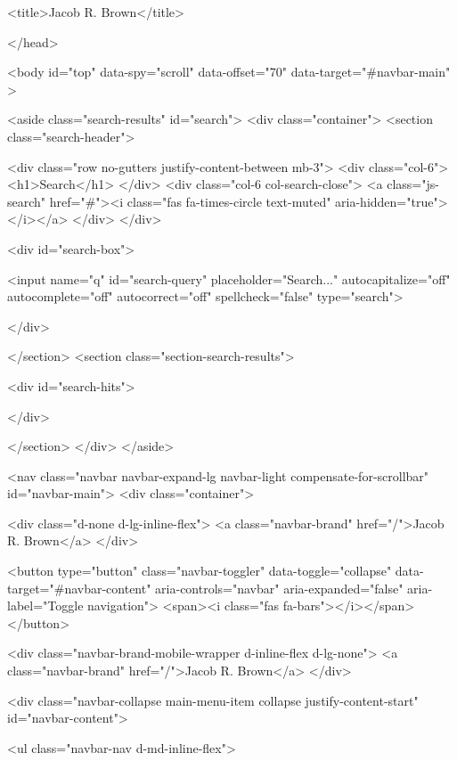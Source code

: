   <title>Jacob R. Brown</title>

</head>

<body id="top" data-spy="scroll" data-offset="70" data-target="#navbar-main" >

  <aside class="search-results" id="search">
  <div class="container">
    <section class="search-header">

      <div class="row no-gutters justify-content-between mb-3">
        <div class="col-6">
          <h1>Search</h1>
        </div>
        <div class="col-6 col-search-close">
          <a class="js-search" href="#"><i class="fas fa-times-circle text-muted" aria-hidden="true"></i></a>
        </div>
      </div>

      <div id="search-box">

        <input name="q" id="search-query" placeholder="Search..." autocapitalize="off"
        autocomplete="off" autocorrect="off" spellcheck="false" type="search">

      </div>

    </section>
    <section class="section-search-results">

      <div id="search-hits">

      </div>

    </section>
  </div>
</aside>










<nav class="navbar navbar-expand-lg navbar-light compensate-for-scrollbar" id="navbar-main">
  <div class="container">


    <div class="d-none d-lg-inline-flex">
      <a class="navbar-brand" href="/">Jacob R. Brown</a>
    </div>



    <button type="button" class="navbar-toggler" data-toggle="collapse"
            data-target="#navbar-content" aria-controls="navbar" aria-expanded="false" aria-label="Toggle navigation">
    <span><i class="fas fa-bars"></i></span>
    </button>



    <div class="navbar-brand-mobile-wrapper d-inline-flex d-lg-none">
      <a class="navbar-brand" href="/">Jacob R. Brown</a>
    </div>




    <div class="navbar-collapse main-menu-item collapse justify-content-start" id="navbar-content">


      <ul class="navbar-nav d-md-inline-flex">
























